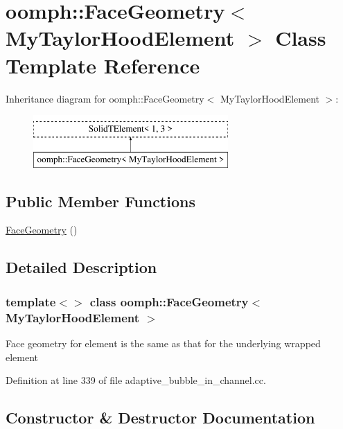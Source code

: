 \hypertarget{classoomph_1_1FaceGeometry_3_01MyTaylorHoodElement_01_4}{}\section{oomph\+:\+:Face\+Geometry$<$ My\+Taylor\+Hood\+Element $>$ Class Template Reference}
\label{classoomph_1_1FaceGeometry_3_01MyTaylorHoodElement_01_4}
Inheritance diagram for oomph\+:\+:Face\+Geometry$<$ My\+Taylor\+Hood\+Element $>$\+:\begin{figure}[H]
\begin{center}
\leavevmode
\includegraphics[height=2.000000cm]{classoomph_1_1FaceGeometry_3_01MyTaylorHoodElement_01_4}
\end{center}
\end{figure}
\subsection*{Public Member Functions}
\begin{DoxyCompactItemize}
\item 
\hyperlink{classoomph_1_1FaceGeometry_3_01MyTaylorHoodElement_01_4_a604dfaeec030bb7a08069c0e2c8805ab}{Face\+Geometry} ()
\end{DoxyCompactItemize}


\subsection{Detailed Description}
\subsubsection*{template$<$$>$\newline
class oomph\+::\+Face\+Geometry$<$ My\+Taylor\+Hood\+Element $>$}

Face geometry for element is the same as that for the underlying wrapped element 

Definition at line 339 of file adaptive\+\_\+bubble\+\_\+in\+\_\+channel.\+cc.



\subsection{Constructor \& Destructor Documentation}
\mbox{\label{classoomph_1_1FaceGeometry_3_01MyTaylorHoodElement_01_4_a604dfaeec030bb7a08069c0e2c8805ab}} 
